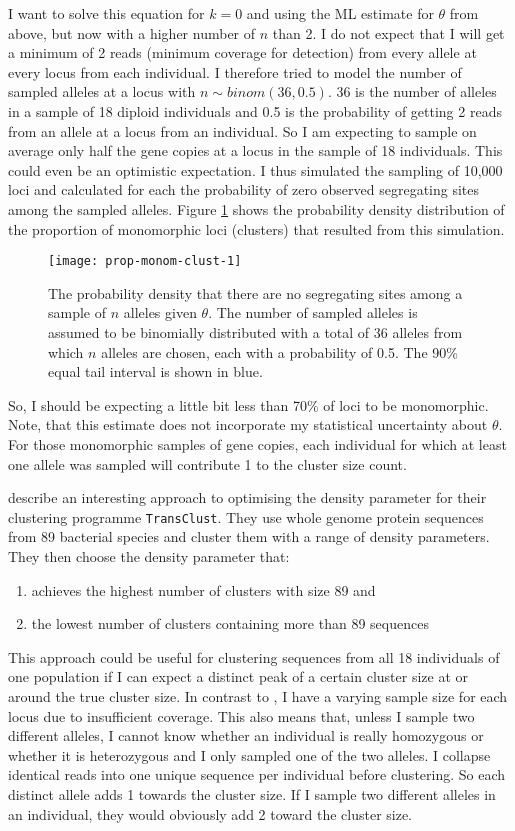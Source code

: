 \documentclass{article}\usepackage[]{graphicx}\usepackage[]{color}
\begin{document}
I want to solve this equation for $k=0$ and using the ML estimate for $\theta$ from above, but now with a higher number of $n$ than 2. I do not expect that I will get a minimum of 2 reads (minimum coverage for detection) from every allele at every locus from each individual. I therefore tried to model the number of sampled alleles at a locus with $n\sim binom(36, 0.5)$. 36 is the number of alleles in a sample of 18 diploid individuals and 0.5 is the probability of getting 2 reads from an allele at a locus from an individual. So I am expecting to sample on average only half the gene copies at a locus in the sample of 18 individuals. This could even be an optimistic expectation. I thus simulated the sampling of 10,000 loci and calculated for each the probability of zero observed segregating sites among the sampled alleles. Figure \ref{Fig:prop-monom-clust-1} shows the probability density distribution of the proportion of monomorphic loci (clusters) that resulted from this simulation.
\begin{figure}
\centering
\texttt{[image: prop-monom-clust-1]}
\caption{The probability density that there are no segregating sites among a sample of $n$ alleles given $\theta$. The number of sampled alleles is assumed to be binomially distributed with a total of 36 alleles from which $n$ alleles are chosen, each with a probability of 0.5. The 90\% equal tail interval is shown in blue.}
\label{Fig:prop-monom-clust-1}
\end{figure}
So, I should be expecting a little bit less than 70\% of loci to be monomorphic. Note, that this estimate does not incorporate my statistical uncertainty about $\theta$. For those monomorphic samples of gene copies, each individual for which at least one allele was sampled will contribute 1 to the cluster size count.


\cite{Roettger2013} describe an interesting approach to optimising the density parameter for their clustering programme \texttt{TransClust}. They use whole genome protein sequences from 89 bacterial species and cluster them with a range of density parameters. They then choose the density parameter that:
\begin{enumerate}
\item achieves the highest number of clusters with size 89 and 
\item the lowest number of clusters containing more than 89 sequences
\end{enumerate}
This approach could be useful for clustering sequences from all 18 individuals of one population if I can expect a distinct peak of a certain cluster size at or around the true cluster size. In contrast to \citealt{Roettger2013}, I have a varying sample size for each locus due to insufficient coverage. This also means that, unless I sample two different alleles, I cannot know whether an individual is really homozygous or whether it is heterozygous and I only sampled one of the two alleles. I collapse identical reads into one unique sequence per individual before clustering. So each distinct allele adds 1 towards the cluster size. If I sample two different alleles in an individual, they would obviously add 2 toward the cluster size. 
\end{document}
